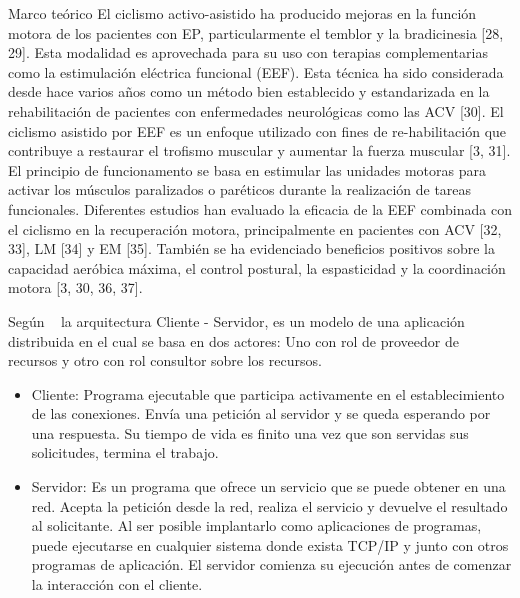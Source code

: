 \begin{thesischapter}{1} {Marco teórico}
    \vspace{5pt}
    El ciclismo activo-asistido ha producido mejoras en la función motora de los pacientes
    con EP, particularmente el temblor y la bradicinesia [28, 29]. Esta modalidad es
    aprovechada para su uso con terapias complementarias como la estimulación eléctrica
    funcional (EEF). Esta técnica ha sido considerada desde hace varios años como un
    método bien establecido y estandarizada en la rehabilitación de pacientes con
    enfermedades neurológicas como las ACV [30]. El ciclismo asistido por EEF es un
    enfoque utilizado con fines de re-habilitación que contribuye a restaurar el trofismo
    muscular y aumentar la fuerza muscular [3, 31]. El principio de funcionamento se basa
    en estimular las unidades motoras para activar los músculos paralizados o paréticos
    durante la realización de tareas funcionales. Diferentes estudios han evaluado la eficacia
    de la EEF combinada con el ciclismo en la recuperación motora, principalmente en
    pacientes con ACV [32, 33], LM [34] y EM [35]. También se ha evidenciado beneficios
    positivos sobre la capacidad aeróbica máxima, el control postural, la espasticidad y la
    coordinación motora [3, 30, 36, 37].
    


    \vspace{10pt}
    Según ~\cite{moyano2020arquitectura} la arquitectura Cliente - Servidor, es 
    un modelo de una aplicación distribuida en el cual se basa en dos actores:
    Uno con rol de proveedor de recursos y otro con rol consultor sobre los recursos.
    \begin{itemize}
        \item Cliente: Programa ejecutable que participa activamente en el establecimiento de las conexiones. Envía una petición al servidor y se queda
        esperando por una respuesta. Su tiempo de vida es finito una vez que son
        servidas sus solicitudes, termina el trabajo.
        \item Servidor: Es un programa que ofrece un servicio que se puede obtener
        en una red. Acepta la petición desde la red, realiza el servicio y devuelve
        el resultado al solicitante. Al ser posible implantarlo como aplicaciones de
        programas, puede ejecutarse en cualquier sistema donde exista TCP/IP y
        junto con otros programas de aplicación. El servidor comienza su ejecución
        antes de comenzar la interacción con el cliente.
    \end{itemize}


\end{thesischapter}
